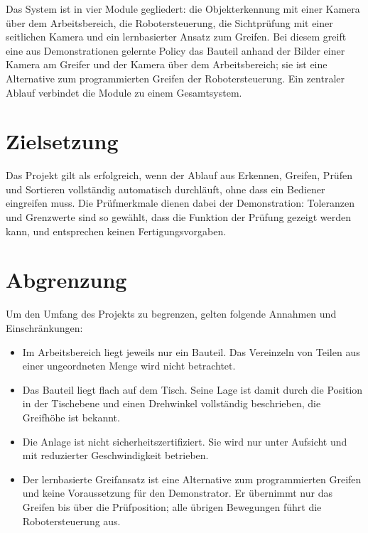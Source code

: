 Das System ist in vier Module gegliedert: die Objekterkennung mit einer Kamera über dem
Arbeitsbereich, die Robotersteuerung, die Sichtprüfung mit einer seitlichen Kamera und ein
lernbasierter Ansatz zum Greifen. Bei diesem greift eine aus Demonstrationen gelernte Policy
das Bauteil anhand der Bilder einer Kamera am Greifer und der Kamera über dem Arbeitsbereich;
sie ist eine Alternative zum programmierten Greifen der Robotersteuerung. Ein zentraler Ablauf
verbindet die Module zu einem Gesamtsystem.

\section{Zielsetzung}

Das Projekt gilt als erfolgreich, wenn der Ablauf aus Erkennen, Greifen, Prüfen und Sortieren
vollständig automatisch durchläuft, ohne dass ein Bediener eingreifen muss. Die Prüfmerkmale
dienen dabei der Demonstration: Toleranzen und Grenzwerte sind so gewählt, dass die Funktion
der Prüfung gezeigt werden kann, und entsprechen keinen Fertigungsvorgaben.

\section{Abgrenzung}

Um den Umfang des Projekts zu begrenzen, gelten folgende Annahmen und Einschränkungen:
\begin{itemize}
  \item Im Arbeitsbereich liegt jeweils nur ein Bauteil. Das Vereinzeln von Teilen aus einer
        ungeordneten Menge wird nicht betrachtet.
  \item Das Bauteil liegt flach auf dem Tisch. Seine Lage ist damit durch die Position in der
        Tischebene und einen Drehwinkel vollständig beschrieben, die Greifhöhe ist bekannt.
  \item Die Anlage ist nicht sicherheitszertifiziert. Sie wird nur unter Aufsicht und mit
        reduzierter Geschwindigkeit betrieben.
  \item Der lernbasierte Greifansatz ist eine Alternative zum programmierten Greifen und
        keine Voraussetzung für den Demonstrator. Er übernimmt nur das Greifen bis über die
        Prüfposition; alle übrigen Bewegungen führt die Robotersteuerung aus.
\end{itemize}

